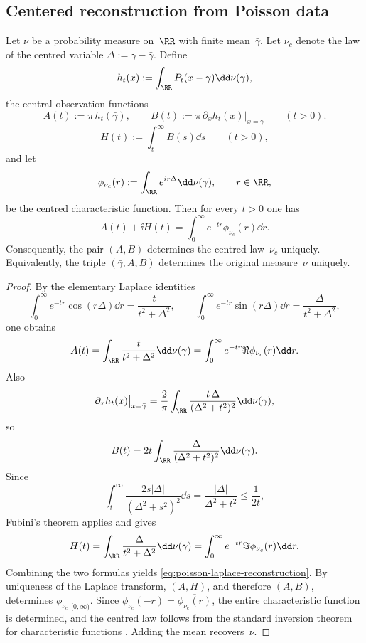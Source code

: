 \subsection{Centered reconstruction from Poisson data}

\begin{theorem}%
\label{thm:poisson-central-two-channel}
Let $\nu$ be a probability measure on~$\RR$ with finite mean~$\bar\gamma$.
Let $\nu_c$ denote the law of the centred variable
$\Delta:=\gamma-\bar\gamma$.  Define
\[
h_t(x):=\int_{\RR}P_t(x-\gamma)\dd\nu(\gamma),
\]
the central observation functions
\[
A(t):=\pi\,h_t(\bar\gamma),
\qquad
B(t):=\pi\,\partial_x h_t(x)\big|_{x=\bar\gamma}
\qquad(t>0).
\]
\[
H(t):=\int_t^\infty B(s)\dd s
\qquad(t>0),
\]
and let
\[
\phi_{\nu_c}(r):=\int_{\RR}e^{ir\Delta}\dd\nu(\gamma),
\qquad r\in\RR,
\]
be the centred characteristic function.  Then for every $t>0$ one has
\begin{equation}\label{eq:poisson-laplace-reconstruction}
A(t)+\ii H(t)
=\int_0^\infty e^{-tr}\phi_{\nu_c}(r)\dd r.
\end{equation}
Consequently, the pair $(A,B)$ determines the centred law~$\nu_c$
uniquely.  Equivalently, the triple $(\bar\gamma,A,B)$ determines the
original measure~$\nu$ uniquely.
\end{theorem}

\begin{proof}
By the elementary Laplace identities
\[
\int_0^\infty e^{-tr}\cos(r\Delta)\dd r=\frac{t}{t^2+\Delta^2},
\qquad
\int_0^\infty e^{-tr}\sin(r\Delta)\dd r=\frac{\Delta}{t^2+\Delta^2},
\]
one obtains
\[
A(t)
=\int_{\RR}\frac{t}{t^2+\Delta^2}\dd\nu(\gamma)
=\int_0^\infty e^{-tr}\Re\phi_{\nu_c}(r)\dd r.
\]
Also
\[
\partial_x h_t(x)\big|_{x=\bar\gamma}
=\frac{2}{\pi}\int_{\RR}\frac{t\,\Delta}{(\Delta^2+t^2)^2}\dd\nu(\gamma),
\]
so
\[
B(t)=2t\int_{\RR}\frac{\Delta}{(\Delta^2+t^2)^2}\dd\nu(\gamma).
\]
Since
\[
\int_t^\infty \frac{2s|\Delta|}{(\Delta^2+s^2)^2}\dd s
=\frac{|\Delta|}{\Delta^2+t^2}
\le \frac{1}{2t},
\]
Fubini's theorem applies and gives
\[
H(t)
=\int_{\RR}\frac{\Delta}{t^2+\Delta^2}\dd\nu(\gamma)
=\int_0^\infty e^{-tr}\Im\phi_{\nu_c}(r)\dd r.
\]
Combining the two formulas yields
\eqref{eq:poisson-laplace-reconstruction}.  By uniqueness of the Laplace
transform, $(A,H)$, and therefore $(A,B)$, determines
$\phi_{\nu_c}|_{[0,\infty)}$.  Since
$\phi_{\nu_c}(-r)=\overline{\phi_{\nu_c}(r)}$, the entire characteristic
function is determined, and the centred law follows from the standard
inversion theorem for characteristic functions
\cite{Widder1941,Lukacs1970,Feller1971}.  Adding the mean recovers~$\nu$.
\end{proof}

